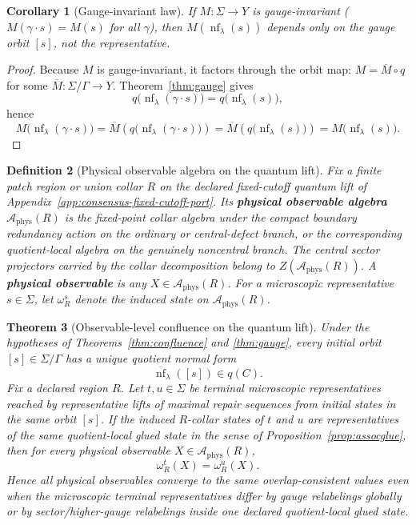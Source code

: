 \documentclass[11pt]{article}
\newtheorem{theorem}{Theorem}[section]
\newtheorem{corollary}[theorem]{Corollary}
\newtheorem{definition}[theorem]{Definition}
\theoremstyle{remark}
\theoremstyle{plain}
\begin{document}
\begin{corollary}[Gauge-invariant law]\label{cor:gaugeinv}
If $M:\Sigma\to Y$ is gauge-invariant ($M(\gamma\cdot s)=M(s)$ for all $\gamma$), then $M(\operatorname{nf}_\lambda(s))$ depends only on the gauge orbit $[s]$, not the representative.
\end{corollary}

\begin{proof}
Because $M$ is gauge-invariant, it factors through the orbit map: $M=\overline M\circ q$ for some
$\overline M:\Sigma/\Gamma\to Y$. Theorem~\ref{thm:gauge} gives
\[
q\bigl(\operatorname{nf}_\lambda(\gamma\cdot s)\bigr)
=
q\bigl(\operatorname{nf}_\lambda(s)\bigr),
\]
hence
\[
M\bigl(\operatorname{nf}_\lambda(\gamma\cdot s)\bigr)
=
\overline M\!\left(q\bigl(\operatorname{nf}_\lambda(\gamma\cdot s)\bigr)\right)
=
\overline M\!\left(q\bigl(\operatorname{nf}_\lambda(s)\bigr)\right)
=
M\bigl(\operatorname{nf}_\lambda(s)\bigr).
\]
\end{proof}

\begin{definition}[Physical observable algebra on the quantum lift]\label{def:physobs}
Fix a finite patch region or union collar \(R\) on the declared fixed-cutoff quantum lift of
Appendix~\ref{app:consensus-fixed-cutoff-port}. Its \textbf{physical observable algebra}
\(\mathcal A_{\mathrm{phys}}(R)\) is the fixed-point collar algebra under the compact boundary
redundancy action on the ordinary or central-defect branch, or the corresponding quotient-local
algebra on the genuinely noncentral branch. The central sector projectors carried by the collar
decomposition belong to \(Z(\mathcal A_{\mathrm{phys}}(R))\). A \textbf{physical observable} is
any \(X\in \mathcal A_{\mathrm{phys}}(R)\). For a microscopic representative \(s\in\Sigma\), let
\(\omega_R^s\) denote the induced state on \(\mathcal A_{\mathrm{phys}}(R)\).
\end{definition}

\begin{theorem}[Observable-level confluence on the quantum lift]\label{thm:obsconfluence}
Under the hypotheses of Theorems~\ref{thm:confluence} and \ref{thm:gauge}, every initial orbit
\([s]\in\Sigma/\Gamma\) has a unique quotient normal form
\[
\overline{\operatorname{nf}}_\lambda([s])\in q(C).
\]
Fix a declared region \(R\). Let \(t,u\in\Sigma\) be terminal microscopic representatives reached
by representative lifts of maximal repair sequences from initial states in the same orbit
\([s]\). If the induced \(R\)-collar states of \(t\) and \(u\) are representatives of the same
quotient-local glued state in the sense of
Proposition~\ref{prop:assocglue}, then for every physical observable
\(X\in\mathcal A_{\mathrm{phys}}(R)\),
\[
\omega_R^t(X)=\omega_R^u(X).
\]
Hence all physical observables converge to the same overlap-consistent values even when the
microscopic terminal representatives differ by gauge relabelings globally or by sector/higher-gauge
relabelings inside one declared quotient-local glued state.
\end{theorem}
\end{document}
